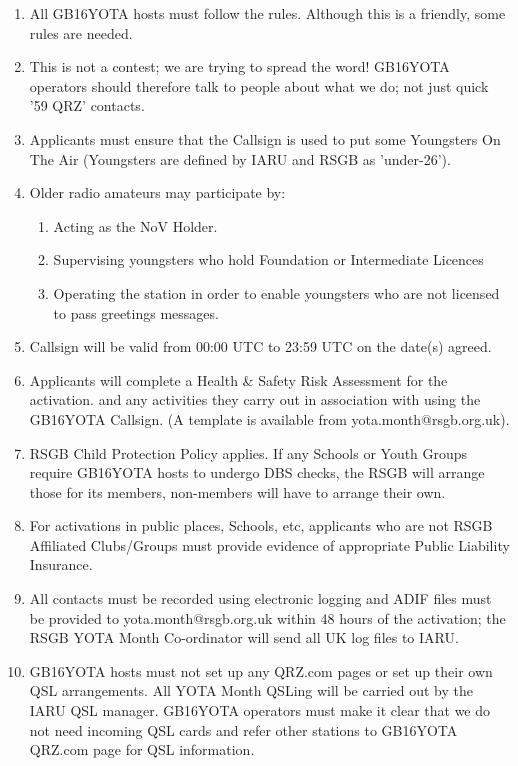 \documentclass{letter}
\begin{document}
\begin{enumerate}
\item All GB16YOTA hosts must follow the rules. Although this is a friendly, some rules are needed.
\item This is not a contest; we are trying to spread the word! GB16YOTA operators should therefore talk to people about what we do; not just quick '59 QRZ' contacts. 
\item Applicants must ensure that the Callsign is used to put some Youngsters On The Air (Youngsters are defined by IARU and RSGB as 'under-26').
\item Older radio amateurs may participate by:
\begin{enumerate}
\item Acting as the NoV Holder.
\item Supervising youngsters who hold Foundation or Intermediate Licences
\item Operating the station in order to enable youngsters who are not licensed to pass greetings messages.
\end{enumerate}
\item  Callsign will be valid from 00:00 UTC to 23:59 UTC on the date(s) agreed.
\item Applicants will complete a Health \& Safety Risk Assessment for the activation. and any activities they carry out in association with using the GB16YOTA Callsign. (A template is available from yota.month@rsgb.org.uk).
\item RSGB Child Protection Policy applies. If any Schools or Youth Groups require GB16YOTA hosts to undergo DBS checks, the RSGB will arrange those for its members, non-members will have to arrange their own. 
\item For activations in public places, Schools, etc, applicants who are not RSGB Affiliated Clubs/Groups must provide evidence of appropriate Public Liability Insurance.
\item All contacts must be recorded using electronic logging and ADIF files must be provided to \newline yota.month@rsgb.org.uk  within 48 hours of the activation; the RSGB YOTA Month Co-ordinator will send all UK log files to IARU.
\item GB16YOTA hosts must not set up any QRZ.com pages or set up their own QSL arrangements. All YOTA Month QSLing will be carried out by the IARU QSL manager. GB16YOTA operators must make it clear that we do not need incoming QSL cards and refer other stations to GB16YOTA QRZ.com page for QSL information.
\end{enumerate}
\end{document}
